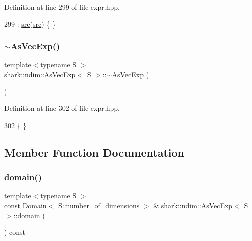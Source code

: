 Definition at line 299 of file expr.\+hpp.


\begin{DoxyCode}
299 : \hyperlink{classshark_1_1ndim_1_1_as_vec_exp_3_01_s_01_4_aa80febebc38b07290aac9a41c7762252}{src}(\hyperlink{classshark_1_1ndim_1_1_as_vec_exp_3_01_s_01_4_aa80febebc38b07290aac9a41c7762252}{src}) \{ \}
\end{DoxyCode}
\hypertarget{classshark_1_1ndim_1_1_as_vec_exp_3_01_s_01_4_a15a9ebc60ced3a8970ad307360936d69}{}\label{classshark_1_1ndim_1_1_as_vec_exp_3_01_s_01_4_a15a9ebc60ced3a8970ad307360936d69} 
\subsubsection{\texorpdfstring{$\sim$\+As\+Vec\+Exp()}{~AsVecExp()}}
{\footnotesize\ttfamily template$<$typename S $>$ \\
\hyperlink{classshark_1_1ndim_1_1_as_vec_exp}{shark\+::ndim\+::\+As\+Vec\+Exp}$<$ S $>$\+::$\sim$\hyperlink{classshark_1_1ndim_1_1_as_vec_exp}{As\+Vec\+Exp} (\begin{DoxyParamCaption}{ }\end{DoxyParamCaption})}



Definition at line 302 of file expr.\+hpp.


\begin{DoxyCode}
302 \{ \}
\end{DoxyCode}


\subsection{Member Function Documentation}
\hypertarget{classshark_1_1ndim_1_1_as_vec_exp_3_01_s_01_4_af27cbff34db3e241f3ebeb84d7afd54c}{}\label{classshark_1_1ndim_1_1_as_vec_exp_3_01_s_01_4_af27cbff34db3e241f3ebeb84d7afd54c} 
\subsubsection{\texorpdfstring{domain()}{domain()}}
{\footnotesize\ttfamily template$<$typename S $>$ \\
const \hyperlink{classshark_1_1ndim_1_1_domain}{Domain}$<$ S\+::number\+\_\+of\+\_\+dimensions $>$ \& \hyperlink{classshark_1_1ndim_1_1_as_vec_exp}{shark\+::ndim\+::\+As\+Vec\+Exp}$<$ S $>$\+::domain (\begin{DoxyParamCaption}{ }\end{DoxyParamCaption}) const\hspace{0.3cm}{\ttfamily [inline]}}



